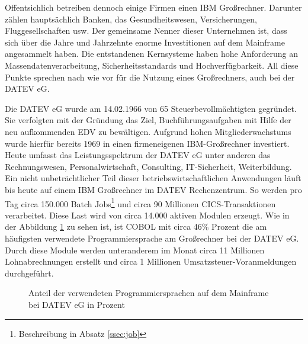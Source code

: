 Offentsichlich betreiben dennoch einige Firmen einen IBM Großrechner.
Darunter zählen hauptsächlich Banken, das Gesundheitswesen, Versicherungen, Fluggesellschaften usw.
Der gemeinsame Nenner dieser Unternehmen ist, dass sich über die Jahre und Jahrzehnte enorme Investitionen auf dem Mainframe angesammelt haben. Die entstandenen Kernsysteme haben hohe Anforderung an Massendatenverarbeitung, Sicherheitsstandards und Hochverfügbarkeit.
All diese Punkte sprechen nach wie vor für die Nutzung eines Großrechners, auch bei der DATEV eG.
\cite{IBM.2014}

Die DATEV eG wurde am 14.02.1966 von 65 Steuerbevollmächtigten gegründet.
Sie verfolgten mit der Gründung das Ziel, Buchführungsaufgaben mit Hilfe der neu aufkommenden EDV zu bewältigen.
Aufgrund hohen Mitgliederwachstums wurde hierfür bereits 1969 in einen firmeneigenen IBM-Großrechner investiert.\cite{DATEVeG.2017}
Heute umfasst das Leistungsspektrum der DATEV eG unter anderen das Rechnungswesen, Personalwirtschaft, Consulting, IT-Sicherheit, Weiterbildung.
Ein nicht unbeträchtlicher Teil dieser betriebswirtschaftlichen Anwendungen läuft bis heute auf einem IBM Großrechner im DATEV Rechenzentrum.
So werden pro Tag circa 150.000 Batch Jobs\footnote{Beschreibung in Absatz \ref{ssec:job}} und circa 90 Millionen CICS-Transaktionen verarbeitet.
Diese Last wird von circa 14.000 aktiven Modulen erzeugt.
Wie in der Abbildung \ref{fig:Programmiersprachen} zu sehen ist, ist COBOL mit circa 46\% Prozent die am häufigsten verwendete Programmiersprache am Großrechner bei der DATEV eG.
Durch diese Module werden unteranderem im Monat circa 11 Millionen Lohnabrechnungen erstellt und circa 1 Millionen Umsatzsteuer-Voranmeldungen durchgeführt.

\begin{figure}
\centering
\caption{Anteil der verwendeten Programmiersprachen auf dem Mainframe bei DATEV eG in Prozent}
\label{fig:Programmiersprachen}
\end{figure}


